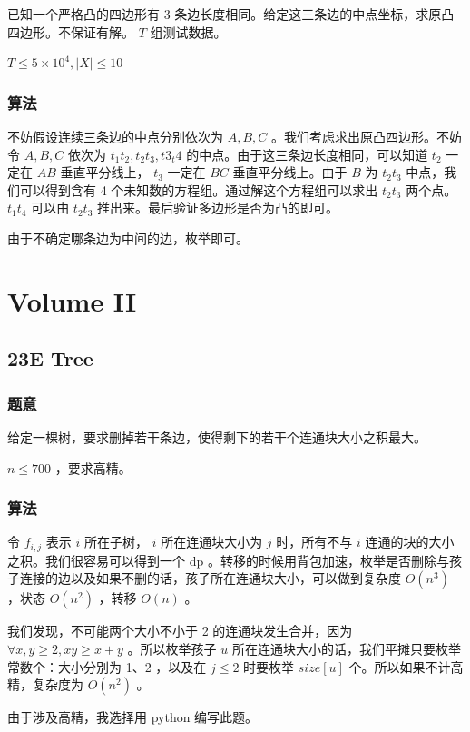 \documentclass[11pt]{article}
\begin{document}
    已知一个严格凸的四边形有 3 条边长度相同。给定这三条边的中点坐标，求原凸四边形。不保证有解。 $T$ 组测试数据。

    $T \leq 5 \times 10^4, |X| \leq 10$
\subsubsection{算法}
\label{sec-1-9-2}

    不妨假设连续三条边的中点分别依次为 $A, B, C$ 。我们考虑求出原凸四边形。不妨令 $A, B, C$ 依次为 $t_1 t_2, t_2 t_3, t3_t4$ 的中点。由于这三条边长度相同，可以知道 $t_2$ 一定在 $AB$ 垂直平分线上， $t_3$ 一定在 $BC$ 垂直平分线上。由于 $B$ 为 $t_2 t_3$ 中点，我们可以得到含有 4 个未知数的方程组。通过解这个方程组可以求出 $t_2 t_3$ 两个点。 $t_1 t_4$ 可以由 $t_2 t_3$ 推出来。最后验证多边形是否为凸的即可。

    由于不确定哪条边为中间的边，枚举即可。
    
\section{Volume II}
\label{sec-2}
\subsection{23E   Tree}
\label{sec-2-1}
\subsubsection{题意}
\label{sec-2-1-1}

    给定一棵树，要求删掉若干条边，使得剩下的若干个连通块大小之积最大。

    $n \leq 700$ ，要求高精。
\subsubsection{算法}
\label{sec-2-1-2}

    令 $f_{i, j}$ 表示 $i$ 所在子树， $i$ 所在连通块大小为 $j$ 时，所有不与 $i$ 连通的块的大小之积。我们很容易可以得到一个 dp 。转移的时候用背包加速，枚举是否删除与孩子连接的边以及如果不删的话，孩子所在连通块大小，可以做到复杂度 $O(n^3)$ ，状态 $O(n^2)$ ，转移 $O(n)$ 。

    我们发现，不可能两个大小不小于 2 的连通块发生合并，因为 $\forall x, y \geq 2, xy \geq x + y$ 。所以枚举孩子 $u$ 所在连通块大小的话，我们平摊只要枚举常数个：大小分别为 1、2 ，以及在 $j \leq 2$ 时要枚举 $size[u]$ 个。所以如果不计高精，复杂度为 $O(n^2)$ 。

    由于涉及高精，我选择用 python 编写此题。
\end{document}
